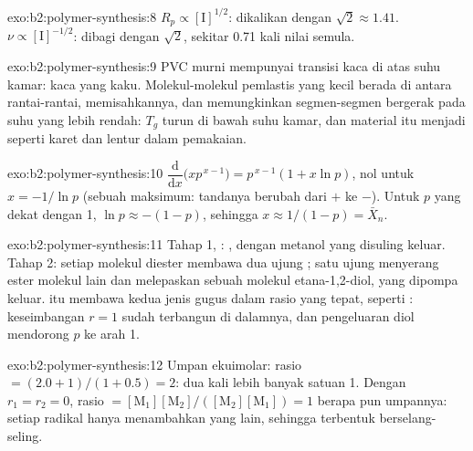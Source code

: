 \begin{solution}{exo:b2:polymer-synthesis:8}
$R_p \propto [\mathrm I]^{1/2}$: dikalikan dengan $\sqrt2 \approx 1.41$. $\nu \propto [\mathrm I]^{-1/2}$:
dibagi dengan $\sqrt 2$, sekitar 0.71 kali nilai semula.
\end{solution}

\begin{solution}{exo:b2:polymer-synthesis:9}
PVC murni mempunyai transisi kaca di atas suhu kamar: kaca yang kaku.
Molekul-molekul pemlastis yang kecil berada di antara rantai-rantai,
memisahkannya, dan memungkinkan segmen-segmen bergerak pada suhu yang lebih
rendah: $T_g$ turun di bawah suhu kamar, dan material itu menjadi seperti
karet dan lentur dalam pemakaian.
\end{solution}

\begin{solution}{exo:b2:polymer-synthesis:10}
$\dfrac{\mathrm d}{\mathrm dx}\bigl(x p^{\,x-1}\bigr) = p^{\,x-1}(1 + x\ln p)$, nol untuk $x = -1/\ln p$
(sebuah maksimum: tandanya berubah dari $+$ ke $-$). Untuk $p$ yang dekat dengan 1, $\ln p \approx -(1-p)$, sehingga $x \approx
1/(1-p) = \bar X_n$.
\end{solution}

\begin{solution}{exo:b2:polymer-synthesis:11}
Tahap 1, : ,
dengan metanol yang disuling keluar. Tahap 2: setiap molekul diester
membawa dua ujung ; satu ujung menyerang ester molekul lain dan
melepaskan sebuah molekul etana-1,2-diol, yang dipompa keluar.  itu
membawa kedua jenis gugus dalam rasio yang tepat, seperti 
: keseimbangan $r = 1$ sudah terbangun di dalamnya, dan pengeluaran
diol mendorong $p$ ke arah 1.
\end{solution}

\begin{solution}{exo:b2:polymer-synthesis:12}
Umpan ekuimolar: rasio $= (2.0 + 1)/(1 + 0.5) = 2$: dua kali lebih banyak satuan  1. Dengan $r_1 = r_2 =
0$, rasio $= [\mathrm M_1][\mathrm M_2]/([\mathrm M_2][\mathrm M_1]) = 1$
berapa pun umpannya: setiap radikal hanya menambahkan  yang lain,
sehingga terbentuk  berselang-seling.
\end{solution}

